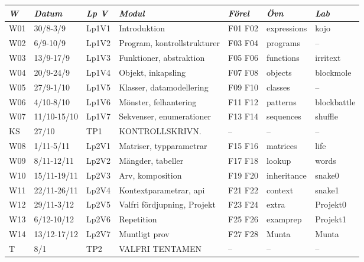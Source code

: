 \begin{tabular}{l|l|l|l|l|l|l}
\textit{W} & \textit{Datum} & \textit{Lp V} & \textit{Modul} & \textit{Förel} & \textit{Övn} & \textit{Lab} \\ \hline \hline
W01 & 30/8-3/9 & Lp1V1 & Introduktion & F01 F02 & expressions & kojo \\
W02 & 6/9-10/9 & Lp1V2 & Program, kontrollstrukturer & F03 F04 & programs & -- \\
W03 & 13/9-17/9 & Lp1V3 & Funktioner, abstraktion & F05 F06 & functions & irritext \\
W04 & 20/9-24/9 & Lp1V4 & Objekt, inkapsling & F07 F08 & objects & blockmole \\
W05 & 27/9-1/10 & Lp1V5 & Klasser, datamodellering & F09 F10 & classes & -- \\
W06 & 4/10-8/10 & Lp1V6 & Mönster, felhantering & F11 F12 & patterns & blockbattle \\
W07 & 11/10-15/10 & Lp1V7 & Sekvenser, enumerationer & F13 F14 & sequences & shuffle \\
KS & 27/10 & TP1 & KONTROLLSKRIVN. & -- & -- & -- \\
W08 & 1/11-5/11 & Lp2V1 & Matriser, typparametrar & F15 F16 & matrices & life \\
W09 & 8/11-12/11 & Lp2V2 & Mängder, tabeller & F17 F18 & lookup & words \\
W10 & 15/11-19/11 & Lp2V3 & Arv, komposition & F19 F20 & inheritance & snake0 \\
W11 & 22/11-26/11 & Lp2V4 & Kontextparametrar, api & F21 F22 & context & snake1 \\
W12 & 29/11-3/12 & Lp2V5 & Valfri fördjupning, Projekt & F23 F24 & extra & Projekt0 \\
W13 & 6/12-10/12 & Lp2V6 & Repetition & F25 F26 & examprep & Projekt1 \\
W14 & 13/12-17/12 & Lp2V7 & Muntligt prov & F27 F28 & Munta & Munta \\
T & 8/1 & TP2 & VALFRI TENTAMEN & -- & -- & -- \\
\end{tabular}
